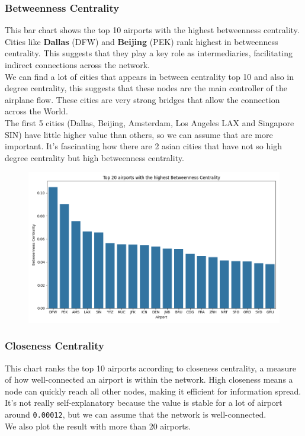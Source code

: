 \documentclass[12pt]{article}
\begin{document}
    \subsubsection{Betweenness Centrality}
    This bar chart shows the top 10 airports with the highest betweenness centrality. \\
    Cities like \textbf{Dallas} (DFW) and \textbf{Beijing} (PEK) rank highest in betweenness centrality. This suggests that they play a key role as intermediaries, facilitating indirect connections across the network.\\
    We can find a lot of cities that appears in between centrality top 10 and also in degree centrality, this suggests that these nodes are the main controller of the airplane flow. These cities are very strong bridges that allow the connection across the World.\\
    The first 5 cities (Dallas, Beijing, Amsterdam, Los Angeles LAX and Singapore SIN) have little higher value than others, so we can assume that are more important. It's fascinating how there are 2 asian cities that have not so high degree centrality but high betweenness centrality.

    \begin{figure}[H]
        \centering
        \includegraphics[width=0.8\linewidth]{img/betweenness_centrality}
    \end{figure}

    \subsubsection{Closeness Centrality}
    This chart ranks the top 10 airports according to closeness centrality, a measure of how well-connected an airport is within the network. High closeness means a node can quickly reach all other nodes, making it efficient for information spread.\\
    It's not really self-explanatory because the value is stable for a lot of airport around \texttt{0.00012}, but we can assume that the network is well-connected.\\
    We also plot the result with more than 20 airports.
\end{document}
